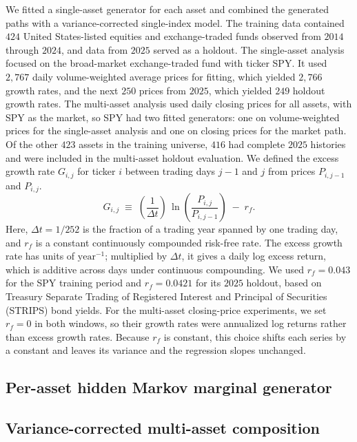 \documentclass{article}
\theoremstyle{definition}
\theoremstyle{remark}
\begin{document}
We fitted a single-asset generator for each asset and combined the generated paths with a variance-corrected single-index model. The training data contained $424$ United States-listed equities and
exchange-traded funds observed from $2014$ through $2024$, and data
from $2025$ served as a holdout. The
single-asset analysis focused on the broad-market exchange-traded fund
with ticker SPY. It used
$2{,}767$ daily volume-weighted average prices for fitting, which
yielded $2{,}766$ growth rates, and the next $250$ prices from $2025$,
which yielded $249$ holdout growth rates. The multi-asset analysis used daily closing prices for all assets,
with SPY as the market, so SPY had two fitted generators: one on
volume-weighted prices for the single-asset analysis and one on
closing prices for the market path. Of
the other $423$ assets in the training universe, $416$ had complete
$2025$ histories and were included in the multi-asset holdout
evaluation. We defined the excess growth rate
$G_{i,j}$ for ticker $i$ between trading days $j-1$ and $j$ from prices
$P_{i,j-1}$ and $P_{i,j}$.
\begin{equation}
    G_{i,j} \;\equiv\; \left(\frac{1}{\Delta t}\right)\,
    \ln\!\left( \frac{P_{i,j}}{P_{i,j-1}} \right) \;-\; r_f.
    \label{eq:growth_rate}
\end{equation}
Here, $\Delta t = 1/252$ is the fraction of a trading year spanned by
one trading day, and $r_f$ is a constant continuously compounded
risk-free rate. The excess growth rate has units of
$\mathrm{year}^{-1}$; multiplied by $\Delta t$, it gives a daily log
excess return, which is additive across days under continuous
compounding. We used $r_f=0.043$ for the SPY training period and
$r_f=0.0421$ for its $2025$ holdout, based on Treasury Separate Trading
of Registered Interest and Principal of Securities (STRIPS) bond yields.
For the multi-asset closing-price experiments, we set $r_f=0$ in both
windows, so their growth rates were annualized log returns rather than excess
growth rates. Because
$r_f$ is constant, this choice shifts each series by a constant and leaves its variance
and the regression slopes unchanged.

\subsection{Per-asset hidden Markov marginal generator}\label{sec:method-hmm}


\subsection{Variance-corrected multi-asset composition}\label{sec:method-sim}

\end{document}
